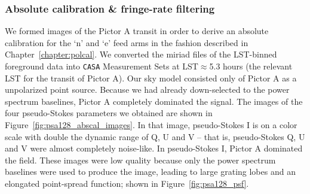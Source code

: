 \subsubsection{Absolute calibration \& fringe-rate filtering}
We formed images of the Pictor A transit in order to derive an absolute calibration for the `n' and `e' feed arms in the fashion described in Chapter~\ref{chapter:polcal}. We converted the {\sc miriad} files of the LST-binned foreground data into {\tt CASA} \citep{casa} Measurement Sets at LST$\approx$5.3 hours (the relevant LST for the transit of Pictor A). 
Our sky model consisted only of Pictor A as a unpolarized point source. Because we had already down-selected to the power spectrum baselines, Pictor A completely dominated the signal. The images of the four pseudo-Stokes parameters we obtained are shown in Figure~\ref{fig:psa128_abscal_images}. In that image, pseudo-Stokes I is on a color scale with double the dynamic range of Q, U and V -- that is, pseudo-Stokes Q, U and V were almost completely noise-like. In pseudo-Stokes I, Pictor A dominated the field. These images were low quality because only the power spectrum baselines were used to produce the image, leading to large grating lobes and an elongated point-spread function; shown in Figure~\ref{fig:psa128_psf}.

